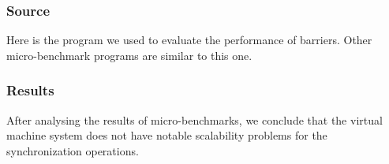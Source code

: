 \subsubsection{Source}
Here is the program we used to evaluate the performance of barriers. Other 
micro-benchmark programs are similar to this one.
\lstset{language=c}
\lstset{caption=Source code for the barrier micro-benchmark}
\lstset{captionpos=b}


\subsubsection{Results}
After analysing the results of micro-benchmarks, we conclude that the virtual
machine system does not have notable scalability problems for the
synchronization operations.

